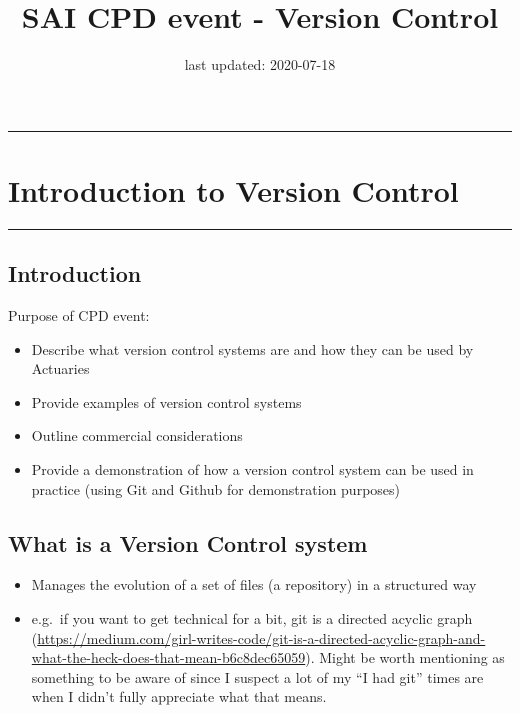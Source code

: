 \documentclass[
]{article}
\title{SAI CPD event - Version Control}
\author{}
\date{\vspace{-2.5em}last updated: 2020-07-18}
\providecommand{\tightlist}{%
  \setlength{\itemsep}{0pt}\setlength{\parskip}{0pt}}
\begin{document}
\maketitle

{
\setcounter{tocdepth}{2}
\tableofcontents
}
\begin{center}\rule{0.5\linewidth}{0.5pt}\end{center}

\hypertarget{introduction-to-version-control}{%
\section{Introduction to Version Control
}\label{introduction-to-version-control}}

\begin{center}\rule{0.5\linewidth}{0.5pt}\end{center}

\hypertarget{introduction}{%
\subsection{Introduction}\label{introduction}}

Purpose of CPD event:

\begin{itemize}
\tightlist
\item
  Describe what version control systems are and how they can be used by
  Actuaries
\item
  Provide examples of version control systems
\item
  Outline commercial considerations
\item
  Provide a demonstration of how a version control system can be used in
  practice (using Git and Github for demonstration purposes)
\end{itemize}

\hypertarget{what-is-a-version-control-system}{%
\subsection{What is a Version Control
system}\label{what-is-a-version-control-system}}

\begin{itemize}
\tightlist
\item
  Manages the evolution of a set of files (a repository) in a structured
  way
\item
  e.g.~if you want to get technical for a bit, git is a directed acyclic
  graph
  (\url{https://medium.com/girl-writes-code/git-is-a-directed-acyclic-graph-and-what-the-heck-does-that-mean-b6c8dec65059}).
  Might be worth mentioning as something to be aware of since I suspect
  a lot of my ``I had git'' times are when I didn't fully appreciate
  what that means.
\end{itemize}
\end{document}
